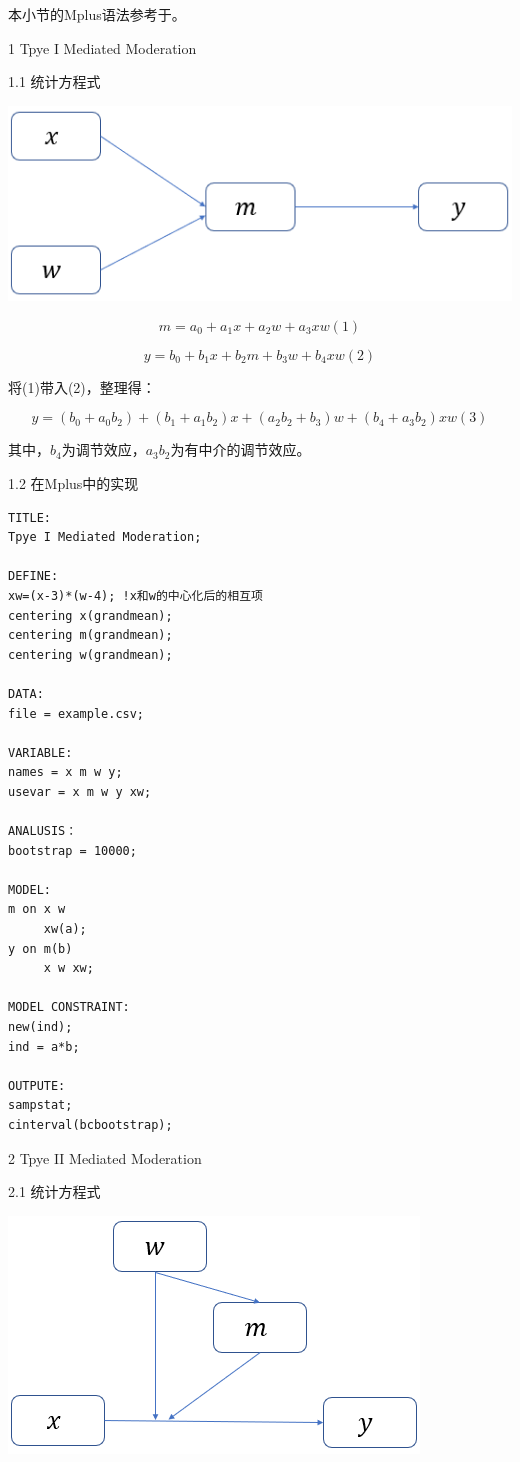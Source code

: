 \documentclass[
]{book}
\begin{document}
本小节的Mplus语法参考于\autocite{liudong2012:StochProc}。

1 Tpye I Mediated Moderation

1.1 统计方程式

\includegraphics{figs/1151.png}

\[
m=a_{0}+a_{1}x+a_{2}w+a_{3}xw(1)
\]

\[
y=b_{0}+b_{1}x+b_{2}m+b_{3}w+b_{4}xw(2)
\]

将(1)带入(2)，整理得：

\[
y=(b_{0}+a_{0}b_{2})+(b_{1}+a_{1}b_{2})x+(a_{2}b_{2}+b_{3})w+(b_{4}+a_{3}b_{2})xw(3)
\]

其中，\(b_{4}\)为调节效应，\(a_{3}b_{2}\)为有中介的调节效应。

1.2 在Mplus中的实现

\begin{verbatim}
TITLE:
Tpye I Mediated Moderation;

DEFINE:
xw=(x-3)*(w-4); !x和w的中心化后的相互项 
centering x(grandmean); 
centering m(grandmean); 
centering w(grandmean); 

DATA:
file = example.csv;

VARIABLE:
names = x m w y;
usevar = x m w y xw;

ANALUSIS：
bootstrap = 10000;

MODEL:
m on x w
     xw(a);
y on m(b)
     x w xw;

MODEL CONSTRAINT:
new(ind);
ind = a*b;

OUTPUTE:
sampstat;
cinterval(bcbootstrap);
\end{verbatim}

2 Tpye II Mediated Moderation

2.1 统计方程式

\includegraphics{figs/1152.png}
\end{document}

